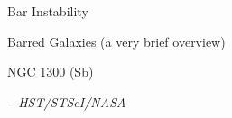 \documentclass[letterpaper,landscape]{slides}
\begin{document}
\begin{slide}

\begin{center}
{\large \color{red} 
                 Bar Instability }
\end{center}

\begin{center}
\vskip -0.0in
\end{center}

\vfill
\end{slide}

\begin{slide}
\begin{center}
\vskip 3in
{\large \color{red} Barred Galaxies (a very brief overview)  }
\end{center}

\end{slide}

\begin{slide}
\begin{center}
{\large \color{red} 
                  NGC 1300 (Sb)  }
\end{center}

\begin{center}
\vskip -0.0in
\end{center}

\begin{flushright}
{ \tiny \em -- HST/STScI/NASA }
\end{flushright}

\vfill
\end{slide}
\end{document}
